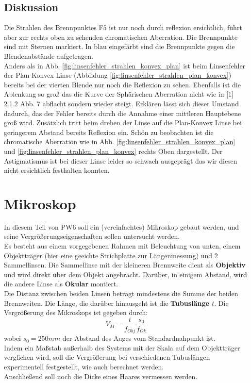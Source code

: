 \documentclass[12pt,a4paper]{article}
\begin{document}
\begin{multicols}{2}

\subsection{Diskussion}
\noindent
Die Strahlen des Brennpunktes F5 ist nur noch durch reflexion ersichtlich, führt aber zur rechts oben zu sehenden chromatischen Aberration. Die Brennpunkte sind mit Sternen markiert. In blau eingefärbt sind die Brennpunkte gegen die Blendenabstände aufgetragen.
\\
Anders als in Abb. \ref{fig:linsenfehler_strahlen_konvex_plan} ist beim Linsenfehler der Plan-Konvex Linse (Abbildung \ref{fig:linsenfehler_strahlen_plan_konvex}) bereits bei der vierten Blende nur noch die Reflexion zu sehen. Ebenfalls ist die Ablenkung so groß das die Kurve der Sphärischen Aberration nicht wie in [1] 2.1.2 Abb. 7 abflacht sondern wieder steigt. Erklären lässt sich dieser Umstand dadurch, das der Fehler bereits durch die Annahme einer mittleren Hauptebene groß wird. Zusätzlich tritt beim drehen der Linse auf die Plan-Konvex Linse bei geringerem Abstand bereits Reflexion ein. Schön zu beobachten ist die chromatische Aberration wie in Abb. \ref{fig:linsenfehler_strahlen_konvex_plan} und \ref{fig:linsenfehler_strahlen_plan_konvex} rechts Oben dargestellt. Der Astigmatismus ist bei dieser Linse leider so schwach ausgeprägt das wir diesen nicht ersichtlich festhalten konnten.

\section{Mikroskop}

In diesem Teil von PW6 soll ein (vereinfachtes) Mikroskop gebaut werden, und seine Vergrößerungseigenschaften sollen untersucht werden.\\
Es besteht aus einem vorgegebenen Rahmen mit Beleuchtung von unten, einem Objektträger (hier eine geeichte Strichplatte zur Längenmessung) und 2 Sammellinsen. Die Sammellinse mit der kleineren Brennweite dient als \textbf{Objektiv} und wird direkt über dem Objekt angebracht. Darüber, in einigem Abstand, wird die andere Linse als \textbf{Okular} montiert.\\
Die Distanz zwischen beiden Linsen beträgt mindestens die Summe der beiden Brennweiten. Die Länge, die darüber hinausgeht ist die \textbf{Tubuslänge $t$}.
Die Vergrößerung des Mikroskops ist gegeben durch:
$$V_M=\frac{t}{f_{Obj}}\frac{s_0}{f_{Ok}}$$
wobei $s_0=250mm$ der Abstand des Auges vom Standardnahpunkt ist.\\
Indem ein Maßstab außerhalb des Systems mit der Skala auf dem Objektträger verglichen wird, soll die Vergrößerung bei verschiedenen Tubuslängen experimentell festgestellt, wie auch berechnet werden.\\
Anschließend soll noch die Dicke eines Haares vermessen werden.


\end{multicols}
\end{document}
